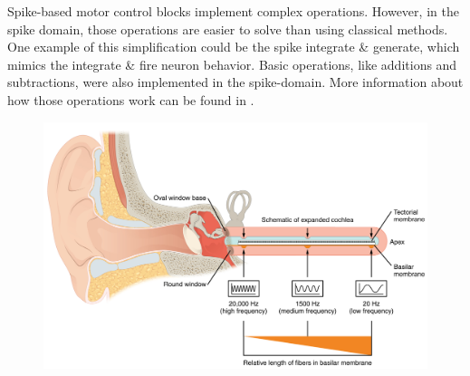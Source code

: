 Spike-based motor control blocks implement complex operations. However, in the spike domain, those operations are easier to solve than using classical methods. One example of this simplification could be the spike integrate \& generate, which mimics the integrate \& fire neuron behavior. Basic operations, like additions and subtractions, were also implemented in the spike-domain. More information about how those operations work can be found in \cite{jimenez2010building}.


\begin{figure}[H]
  \centering
  \begin{minipage}[b]{0.8\textwidth}
    \centering
    \includegraphics[width=1\textwidth]{biological_ear_model.jpg}
    \label{fig:biological_model}
  \end{minipage}
  \\%
  \begin{minipage}[b]{1\textwidth}
    \centering

\end{minipage}
\end{figure}
